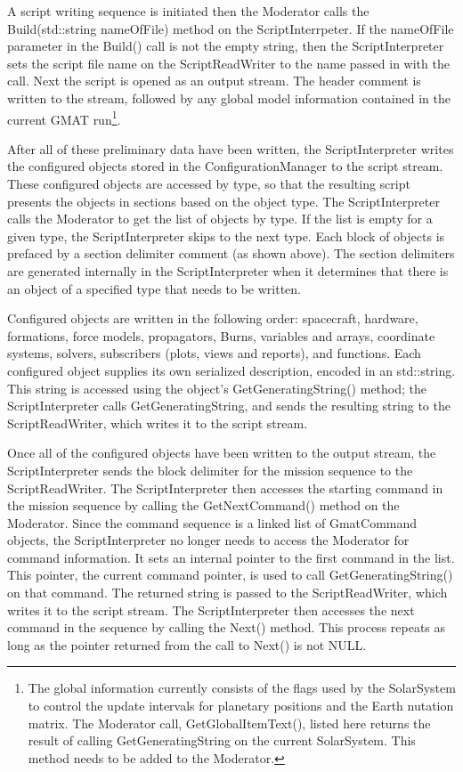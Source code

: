 A script writing sequence is initiated then the Moderator calls the Build(std::string nameOfFile)
method on the ScriptInterrpeter.  If the nameOfFile parameter in the Build() call is not the empty
string, then the ScriptInterpreter sets the script file name on the ScriptReadWriter to the name
passed in with the call.  Next the script is opened as an output stream.  The header comment is
written to the stream, followed by any global model information contained in the current GMAT
run\footnote{The global information currently consists of the flags used by the SolarSystem to
control the update intervals for planetary positions and the Earth nutation matrix.  The Moderator
call, GetGlobalItemText(), listed here returns the result of calling GetGeneratingString on the
current SolarSystem.  This method needs to be added to the Moderator.}.

After all of these preliminary data have been written, the ScriptInterpreter writes the configured
objects stored in the ConfigurationManager to the script stream.  These configured objects are
accessed by type, so that the resulting script presents the objects in sections based on the object
type.  The ScriptInterpreter calls the Moderator to get the list of objects by type.  If the list
is empty for a given type, the ScriptInterpreter skips to the next type.  Each block of objects is
prefaced by a section delimiter comment (as shown above). The section delimiters are generated
internally in the ScriptInterpreter when it determines that there is an object of a specified type
that needs to be written.

Configured objects are written in the following order: spacecraft, hardware, formations, force
models, propagators, Burns, variables and arrays, coordinate systems, solvers, subscribers (plots,
views and reports), and functions.  Each configured object supplies its own serialized description,
encoded in an std::string.  This string is accessed using the object's GetGeneratingString()
method; the ScriptInterpreter calls GetGeneratingString, and sends the resulting string to the
ScriptReadWriter, which writes it to the script stream.

Once all of the configured objects have been written to the output stream, the ScriptInterpreter
sends the block delimiter for the mission sequence to the ScriptReadWriter.  The ScriptInterpreter
then accesses the starting command in the mission sequence by calling the GetNextCommand() method
on the Moderator.  Since the command sequence is a linked list of GmatCommand objects, the
ScriptInterpreter no longer needs to access the Moderator for command information.  It sets an
internal pointer to the first command in the list.  This pointer, the current command pointer,
is used to call GetGeneratingString() on that command.  The returned string is passed to the
ScriptReadWriter, which writes it to the script stream.  The ScriptInterpreter then accesses the
next command in the sequence by calling the Next() method.  This process repeats as long as the
pointer returned from the call to Next() is not NULL.

